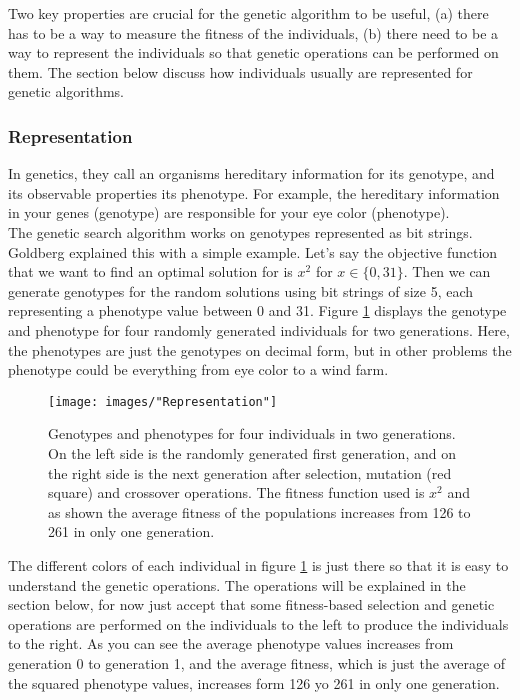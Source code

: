 \documentclass{article}
\begin{document}
\noindent Two key properties are crucial for the genetic algorithm to be useful, (a) there has to be a way to measure the fitness of the individuals, (b) there need to be a way to represent the individuals so that genetic operations can be performed on them. The section below discuss how individuals usually are represented for genetic algorithms.


\subsubsection{Representation}%
In genetics, they call an organisms hereditary information for its genotype, and its observable properties its phenotype. For example, the hereditary information in your genes (genotype) are responsible for your eye color (phenotype).\\

\noindent The genetic search algorithm works on genotypes represented as bit strings. Goldberg explained this with a simple example. Let's say the objective function that we want to find an optimal solution for is $x^2$ for $x \in \{0, 31\}$. Then we can generate genotypes for the random solutions using bit strings of size 5, each representing a phenotype value between 0 and 31. Figure \ref{Representation} displays the genotype and phenotype for four randomly generated individuals for two generations. Here, the phenotypes are just the genotypes on decimal form, but in other problems the phenotype could be everything from eye color to a wind farm.\\


\begin{figure}[h!]
\begin{center}
\texttt{[image: images/"Representation"]}
\caption{Genotypes and phenotypes for four individuals in two generations. On the left side is the randomly generated first generation, and on the right side is the next generation after selection, mutation (red square) and crossover operations. The fitness function used is $x^2$ and as shown the average fitness of the populations increases from 126 to 261 in only one generation.}
\label{Representation}
\end{center}
\end{figure}


\noindent The different colors of each individual in figure \ref{Representation} is just there so that it is easy to understand the genetic operations. The operations will be explained in the section below, for now just accept that some fitness-based selection and genetic operations are performed on the individuals to the left to produce the individuals to the right. As you can see the average phenotype values increases from generation 0 to generation 1, and the average fitness, which is just the average of the squared phenotype values, increases form 126 yo 261 in only one generation. 
\end{document}
